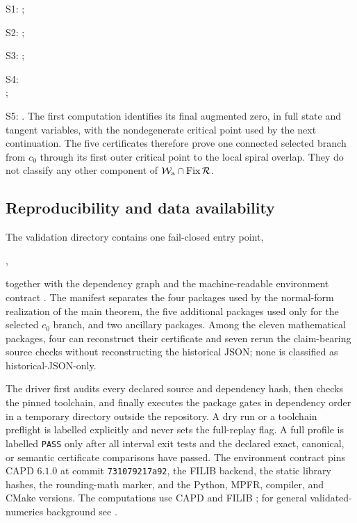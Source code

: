 \documentclass[11pt]{amsart}
\numberwithin{equation}{section}
\theoremstyle{definition}
\theoremstyle{remark}
\newcommand{\cR}{\mathcal R}
\newcommand{\Fix}{\operatorname {Fix}}
\begin{document}
\begingroup\small
\noindent S1: ;\par
\noindent S2: ;\par
\noindent S3: ;\par
\noindent S4: \\
;\par
\noindent S5: .
\endgroup
The first computation identifies its final augmented zero, in full state and
tangent variables, with the nondegenerate critical point used by the next
continuation.  The five
certificates therefore prove one connected selected branch from $c_0$ through
its first outer critical point to the local spiral overlap.  They do not classify any
other component of $\mathcal W_{\rm a}\cap\Fix\cR$.

\subsection{Reproducibility and data availability}

The validation directory contains one fail-closed entry point,
\begin{center}
\small{},
\end{center}
together with the dependency graph
 and the machine-readable environment
contract .  The manifest separates
the four packages used by the normal-form realization of the main theorem,
the five additional packages used only for the selected $c_0$ branch, and
two ancillary packages.  Among the eleven mathematical packages, four can
reconstruct their certificate and seven rerun the claim-bearing source
checks without reconstructing the historical JSON; none is classified as
historical-JSON-only.

The driver first audits every declared source and dependency hash, then
checks the pinned toolchain, and finally executes the package gates in
dependency order in a temporary directory outside the repository.  A dry
run or a toolchain preflight is labelled explicitly and never sets the
full-replay flag.  A full profile is labelled \texttt{PASS} only after all
interval exit tests and the declared exact, canonical, or semantic
certificate comparisons have passed.  The environment contract pins CAPD
$6.1.0$ at commit \texttt{731079217a92}, the FILIB backend, the static
library hashes, the rounding-math marker, and the Python, MPFR, compiler,
and CMake versions.  The computations use CAPD
\cite{KapelaMrozekWilczakZgliczynski2021CAPD} and FILIB
\cite{LerchTischlerWolffVonGudenbergHofschusterKramer2006FILIB}; for general
validated-numerics background see \cite{Tucker2011Validated}.
\end{document}
